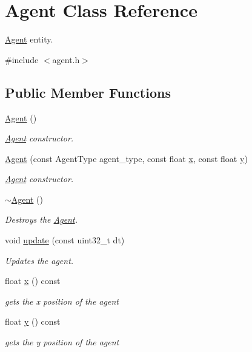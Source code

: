 \hypertarget{class_agent}{}\section{Agent Class Reference}
\label{class_agent}


\mbox{\hyperlink{class_agent}{Agent}} entity.  




{\ttfamily \#include $<$agent.\+h$>$}

\subsection*{Public Member Functions}
\begin{DoxyCompactItemize}
\item 
\mbox{\hyperlink{class_agent_a24a60f1d260bf19a4f7f8a5f36881d3f}{Agent}} ()
\begin{DoxyCompactList}\small\item\em \mbox{\hyperlink{class_agent}{Agent}} constructor. \end{DoxyCompactList}\item 
\mbox{\hyperlink{class_agent_a60d156a1030622542fd9d05d75f1a228}{Agent}} (const Agent\+Type agent\+\_\+type, const float \mbox{\hyperlink{class_agent_a51aac7a6281e83d26d4c85475851cbf4}{x}}, const float \mbox{\hyperlink{class_agent_a077acfc535e9ef3b0630beaa818627a4}{y}})
\begin{DoxyCompactList}\small\item\em \mbox{\hyperlink{class_agent}{Agent}} constructor. \end{DoxyCompactList}\item 
\mbox{\hyperlink{class_agent_ab8dd8d152605cf1339fed595376e83cb}{$\sim$\+Agent}} ()
\begin{DoxyCompactList}\small\item\em Destroys the \mbox{\hyperlink{class_agent}{Agent}}. \end{DoxyCompactList}\item 
void \mbox{\hyperlink{class_agent_ad2a45ec70d014fedacd6b1a1f82b4158}{update}} (const uint32\+\_\+t dt)
\begin{DoxyCompactList}\small\item\em Updates the agent. \end{DoxyCompactList}\item 
float \mbox{\hyperlink{class_agent_a51aac7a6281e83d26d4c85475851cbf4}{x}} () const
\begin{DoxyCompactList}\small\item\em gets the x position of the agent \end{DoxyCompactList}\item 
float \mbox{\hyperlink{class_agent_a077acfc535e9ef3b0630beaa818627a4}{y}} () const
\begin{DoxyCompactList}\small\item\em gets the y position of the agent \end{DoxyCompactList}\end{DoxyCompactItemize}



